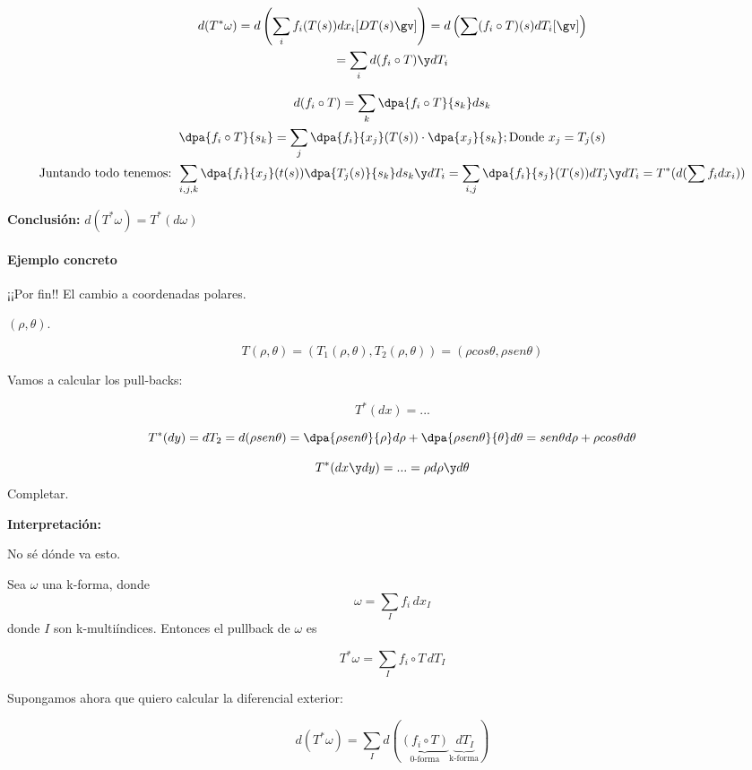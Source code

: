 \begin{gather*}
d(T^{\ast} \omega) = d\left(\sum_i f_i(T(s)) dx_i [DT(s)\gv]\right) = d\left(\sum (f_i \circ T)(s) dT_i[\gv]\right)\\
= \sum_i d(f_i\circ T)\y dT_i
\end{gather*}

\begin{gather*}
d(f_i\circ T) =  \sum_k \dpa{f_i\circ T}{s_k} ds_k \\
\dpa{f_i\circ T}{s_k} = \sum_j \dpa{f_i}{x_j}(T(s))\cdot \dpa{x_j}{s_k}; \text{Donde }x_j = T_j(s)\\
\text{Juntando todo tenemos: }
\sum_{i,j,k} \dpa{f_i}{x_j}(t(s)) \dpa{T_j(s)}{s_k} ds_k \y dT_i = \sum_{i,j} \dpa{f_i}{s_j}(T(s)) dT_j\y dT_i = T^{\ast}(d(\sum f_i dx_i))
 \end{gather*}
 
 \textbf{Conclusión: } $d(T^{\ast}\omega) = T^{\ast}(d\omega)$
 
 
 \paragraph{Ejemplo concreto} ¡¡Por fin!! El cambio a coordenadas polares.
 
 $(\rho,\theta)$.
 
 
 \[T(\rho,\theta) =\left( T_1(\rho,\theta),T_2(\rho,\theta)\right) = (\rho cos\theta,\rho sen\theta)\]
 
 Vamos a calcular los pull-backs:
 
 \[T^{\ast}(dx) = ...\]
 
 \[T^{\ast} (dy) = dT_2 = d(\rho sen\theta) = \dpa{\rho sen\theta}{\rho} d\rho + \dpa{\rho sen\theta}{\theta}d\theta =sen\theta d\rho + \rho cos\theta d\theta\]
 
 \[T^{\ast}(dx\y dy) = ... = \rho d\rho \y d\theta\]
Completar.

\textbf{Interpretación:}

No sé dónde va esto.

Sea $ω$ una k-forma, donde \[ ω = \sum_I f_i \, dx_I \] donde $I$ son k-multiíndices. Entonces el pullback de $ω$ es 

\[ T^\ast ω = \sum_I f_i\circ T \, dT_I \]

Supongamos ahora que quiero calcular la diferencial exterior:

\begin{equation} d(T^\ast ω) = \sum_I d(\underbrace{
	(f_i\circ T)}_{\text{0-forma}}
	\underbrace{\,dT_I}_{\text{k-forma}})\label{eqSuputamadre} 
	\end{equation}

